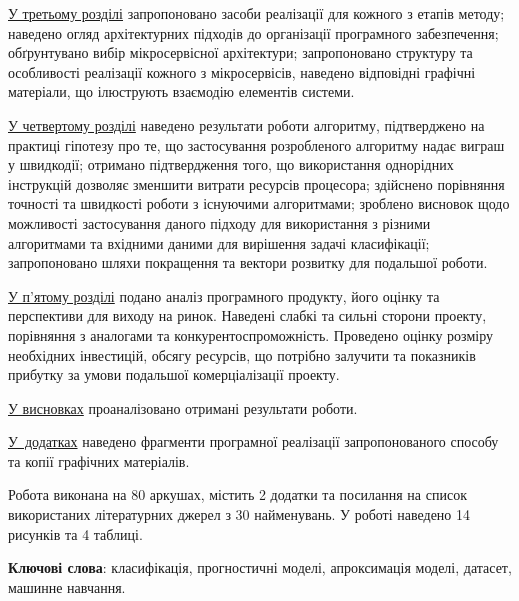 \documentclass[14pt]{article}
\begin{document}
\underline{У третьому розділі} запропоновано засоби реалізації для кожного з етапів методу; наведено огляд архітектурних підходів до організації програмного забезпечення; обґрунтувано вибір мікросервісної архітектури; запропоновано структуру та особливості реалізації кожного з мікросервісів, наведено відповідні графічні матеріали, що ілюструють взаємодію елементів системи.

\underline{У четвертому розділі} наведено результати роботи алгоритму, підтверджено на практиці гіпотезу про те, що застосування розробленого алгоритму надає виграш у швидкодії; отримано підтвердження того, що використання однорідних інструкцій дозволяє зменшити витрати ресурсів процесора; здійснено порівняння точності та швидкості роботи з існуючими алгоритмами; зроблено висновок щодо можливості застосування даного підходу для використання з різними алгоритмами та вхідними даними для вирішення задачі класифікації; запропоновано шляхи покращення та вектори розвитку для подальшої роботи.

\underline{У п'ятому розділі} подано аналіз програмного продукту, його оцінку та перспективи для виходу на ринок. Наведені слабкі та сильні сторони проекту, порівняння з аналогами та конкурентоспроможність. Проведено оцінку розміру необхідних інвестицій, обсягу ресурсів, що потрібно залучити та показників прибутку за умови подальшої комерціалізації проекту.

\underline{У висновках} проаналізовано отримані результати роботи.

\underline{У додатках} наведено фрагменти програмної реалізації запропонованого способу та копії графічних матеріалів.

Робота виконана на  80 аркушах, містить 2 додатки та посилання на список використаних літературних джерел з 30 найменувань. У роботі наведено 14 рисунків та 4 таблиці.

\textbf{Ключові слова}: класифікація, прогностичні моделі, апроксимація моделі, датасет, машинне навчання.
\end{document}
